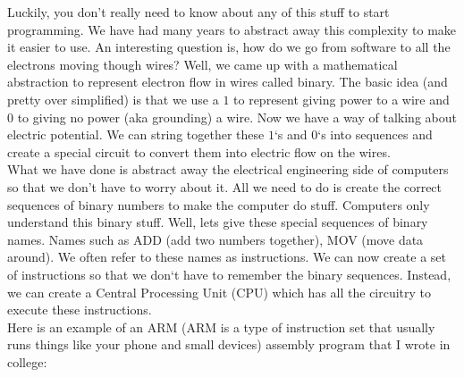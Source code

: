 \documentclass[11]{article}
\begin{document}
Luckily, you don't really need to know about any of this stuff to start programming. We have had many years to abstract away this complexity to make it easier to use. An interesting question is, how do we go from software to all the electrons moving though wires? Well, we came up with a mathematical abstraction to represent electron flow in wires called binary. The basic idea (and pretty over simplified) is that we use a $1$ to represent giving power to a wire and $0$ to giving no power (aka grounding) a wire. Now we have a way of talking about electric potential. We can string together these $1$`s and $0$`s into sequences and create a special circuit to convert them into electric flow on the wires.\\

What we have done is abstract away the electrical engineering side of computers so that we don't have to worry about it. All we need to do is create the correct sequences of binary numbers to make the computer do stuff. Computers only understand this binary stuff. Well, lets give these special sequences of binary names. Names such as ADD (add two numbers together), MOV (move data around). We often refer to these names as instructions. We can now create a set of instructions so that we don`t have to remember the binary sequences. Instead, we can create a Central Processing Unit (CPU) which has all the circuitry to execute these instructions.\\

Here is an example of an ARM (ARM is a type of instruction set that usually runs things like your phone and small devices) assembly program that I wrote in college:
\end{document}
